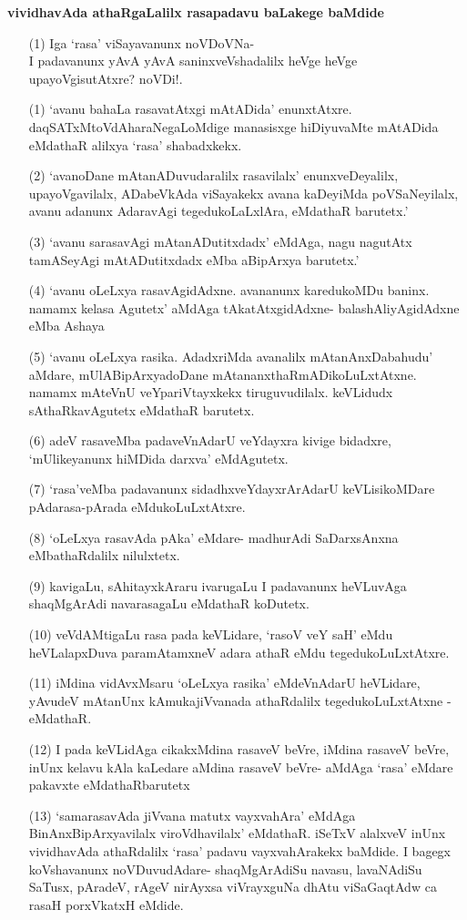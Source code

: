 {\bigskip
\noindent
{\large\bf vividhavAda athaRgaLalilx rasapadavu baLakege baMdide}}\label{page217}

\begin{itemize}
\item[(1)] Iga `rasa' viSayavanunx noVDoVNa-\\
I padavanunx yAvA yAvA saninxveVshadalilx heVge heVge upayoVgisutAtxre? noVDi!.
\item[(1)] `avanu bahaLa rasavatAtxgi mAtADida' enunxtAtxre. daqSATxMtoVdAharaNegaLoMdige mana\-sisxge hiDiyuvaMte mAtADida eMdathaR alilxya `rasa' shabadxkekx.
\item[(2)] `avanoDane mAtanADuvudaralilx rasavilalx' enunxveDeyalilx, upayoVga\-vilalx, ADabeVkAda viSa\-yakekx avana kaDeyiMda poVSaNeyilalx, avanu adanunx AdaravAgi tegedukoLaLxlAra, eMdathaR barutetx.'
\item[(3)] `avanu sarasavAgi mAtanADutitxdadx' eMdAga, nagu nagutAtx tamASeyAgi mAtADutitxdadx eMba aBipArxya barutetx.'
\item[(4)] `avanu oLeLxya rasavAgidAdxne. avananunx karedukoMDu baninx. namamx kelasa Agutetx' aMdAga tAkatAtxgidAdxne- balashAliyAgidAdxne eMba Ashaya
\item[(5)] `avanu oLeLxya rasika. AdadxriMda avanalilx mAtanAnxDabahudu' aMdare, mUlABipArxya\-doDane mAtananxthaRmADikoLuLxtAtxne. namamx mAteVnU veYpariVtayxkekx tiruguvudilalx. keVLidudx sAthaRka\-vAgutetx eMdathaR barutetx.
\item[(6)] adeV rasaveMba padaveVnAdarU veYdayxra kivige bidadxre, `mUlikeyanunx hiMDida darxva' eMdA\-gutetx.
\item[(7)] `rasa'veMba padavanunx sidadhxveYdayxrArAdarU keVLisikoMDare pAdarasa-pArada eMdukoLuLxtAtxre.
\item[(8)] `oLeLxya rasavAda pAka' eMdare- madhurAdi SaDarxsAnxna eMbathaRdalilx nilulxtetx.
\item[(9)] kavigaLu, sAhitayxkAraru ivarugaLu I padavanunx heVLuvAga shaqMgArAdi navarasagaLu eMdathaR koDutetx.
\item[(10)] veVdAMtigaLu rasa pada keVLidare, `rasoV veY saH'\label{223} eMdu heVLalapxDuva paramAtamxneV adara athaR eMdu tegedukoLuLxtAtxre.
\item[(11)] iMdina vidAvxMsaru `oLeLxya rasika' eMdeVnAdarU heVLidare, yAvudeV mAtanUnx kAmuka\-jiVvanada athaRdalilx tegedukoLuLxtAtxne - eMdathaR.
\item[(12)] I pada keVLidAga cikakxMdina rasaveV beVre, iMdina rasaveV beVre, inUnx kelavu kAla kaLedare aMdina rasaveV beVre- aMdAga `rasa' eMdare pakavxte eMdathaRbarutetx
\item[(13)] `samarasavAda jiVvana matutx vayxvahAra' eMdAga BinAnxBipArxyavilalx viroVdhavilalx' eMdathaR. iSeTxV alalxveV inUnx vividhavAda athaRdalilx `rasa' padavu vayxvahArakekx baMdide. I bagegx koVsha\-vanunx noVDuvudAdare- shaqMgArAdiSu navasu, lavaNAdiSu SaTusx, pAradeV, rAgeV nirAyxsa viVrayxguNa dhAtu viSaGaqtAdw ca rasaH porxVkatxH eMdide.
\end{itemize}

